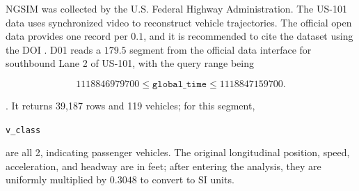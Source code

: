 \documentclass[11pt,a4paper,openany]{book}
\numberwithin{equation}{chapter}
\numberwithin{figure}{chapter}
\numberwithin{table}{chapter}
\begin{document}
NGSIM was collected by the U.S. Federal Highway Administration. The US-101 data uses synchronized video to reconstruct vehicle trajectories. The official open data provides one record per $0.1$, and it is recommended to cite the dataset using the DOI \cite{ngsim2016}. D01 reads a $179.5$ segment from the official data interface for southbound Lane 2 of US-101, with the query range being

\[
1118846979700\le \texttt{global\_time}\le1118847159700.
\]

. It returns 39,187 rows and 119 vehicles; for this segment,




\texttt{v\_class}




 are all 2, indicating passenger vehicles. The original longitudinal position, speed, acceleration, and headway are in feet; after entering the analysis, they are uniformly multiplied by $0.3048$ to convert to SI units.
\end{document}
